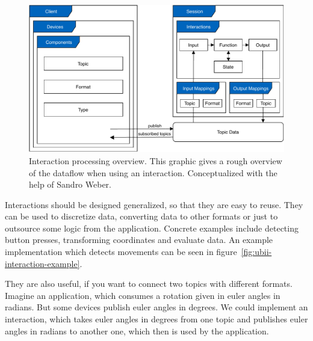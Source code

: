 \begin{figure}[htpb]
  \centering
  \includegraphics[width=12cm]{figures/ubii_cd.pdf}
  \caption[UBII Communication Diagram]{Interaction processing overview. This graphic gives a rough overview of the dataflow when using an interaction. Conceptualized with the help of Sandro Weber.}\label{fig:ubii-cd}
\end{figure}

Interactions should be designed generalized, so that they are easy to reuse. They can be used to discretize data, converting data to other formats or just to outsource some logic from the application. Concrete examples include detecting button presses, transforming coordinates and evaluate data. An example implementation which detects movements can be seen in figure~\ref{fig:ubii-interaction-example}.

They are also useful, if you want to connect two topics with different formats. Imagine an application, which consumes a rotation given in euler angles in radians. But some devices publish euler angles in degrees. We could implement an interaction, which takes euler angles in degrees from one topic and publishes euler angles in radians to another one, which then is used by the application.

